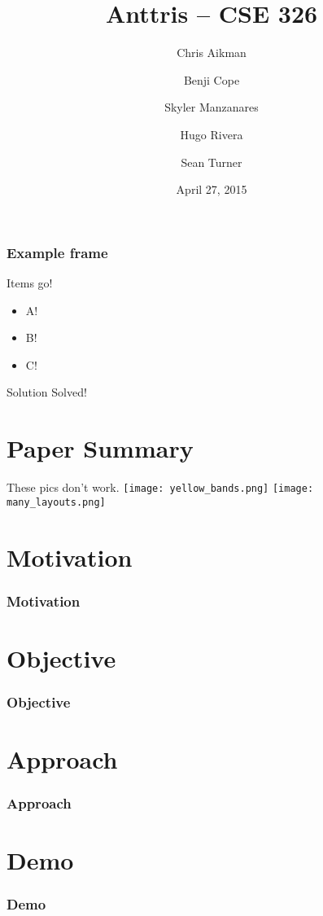 \documentclass{beamer}
\title{Anttris -- CSE 326}
\author{%
\and Chris Aikman
\and Benji Cope
\and Skyler Manzanares
\and Hugo Rivera
\and Sean Turner}
\date{April 27, 2015}
\begin{document}
\begin{frame}
\titlepage
\end{frame}

\begin{frame}
    \frametitle{Example frame}
    Items go!
\begin{itemize}
\pause \item A!
\pause \item B!
\pause \item C!
\end{itemize}

\begin{alertblock}{Solution}
Solved!
\end{alertblock}

\end{frame}

\section{Paper Summary}
\begin{frame}
    These pics don't work.
\texttt{[image: yellow\_bands.png]}
\pause
\texttt{[image: many\_layouts.png]}
\end{frame}



\section{Motivation}
\begin{frame}
  \frametitle{Motivation}
\end{frame}

\section{Objective}
\begin{frame}
  \frametitle{Objective}
\end{frame}

\section{Approach}
\begin{frame}
  \frametitle{Approach}
\end{frame}

\section{Demo}
\begin{frame}
  \frametitle{Demo}
\end{frame}
\end{document}
